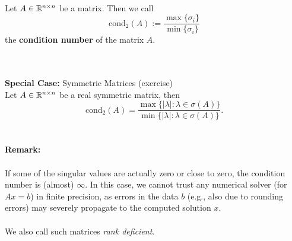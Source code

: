\begin{frame}
	~\\
\begin{definition}\label{def:conditionnumber}
Let $A\in {\mathbb{R}}^{n\times n}$ be a matrix. Then we call 
$$\text{cond}_2(A):=\frac{\max\{\sigma_i\}}{\min\{\sigma_i\}}$$ 
the \textbf{condition number} of the matrix $A$.
\end{definition}
~\\~\\
\textbf{Special Case:} Symmetric Matrices { (exercise)}\\[9pt]
Let $A\in{\mathbb{R}}^{n\times n}$ be a real symmetric matrix, then $$\text{cond}_2(A)=\frac{\max\{|\lambda|\colon \lambda\in\sigma{(A)}\}}{\min\{|\lambda|\colon \lambda\in\sigma{(A)}\}}.$$
	~\\~\\
\textbf{Remark:}\\~\\ If some of the singular values are actually zero or close to zero, the condition number is (almost) $\infty$. In this case, we cannot trust any numerical solver (for $Ax=b$) in finite precision, as errors in the data $b$ (e.g., also due to rounding errors) may severely propagate to the computed solution $x$.\\~\\ We also call such matrices \textit{rank deficient}.
\end{frame}








